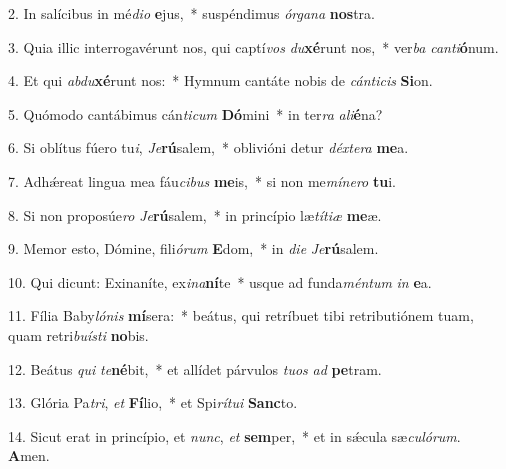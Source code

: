 2. In salícibus in mé\textit{di}\textit{o} \textbf{e}jus,~*  suspéndimus \textit{ór}\textit{ga}\textit{na} \textbf{nos}tra.\

3. Quia illic interrogavérunt nos, qui captí\textit{vos} \textit{du}\textbf{xé}runt nos,~*  ver\textit{ba} \textit{can}\textit{ti}\textbf{ó}num.\

4. Et qui \textit{ab}\textit{du}\textbf{xé}runt nos:~*  Hymnum cantáte nobis de \textit{cán}\textit{ti}\textit{cis} \textbf{Si}on.\

5. Quómodo cantábimus cán\textit{ti}\textit{cum} \textbf{Dó}mini~*  in ter\textit{ra} \textit{a}\textit{li}\textbf{é}na?\

6. Si oblítus fúero tu\textit{i}, \textit{Je}\textbf{rú}salem,~*  oblivióni detur \textit{déx}\textit{te}\textit{ra} \textbf{me}a.\

7. Adhǽreat lingua mea fáu\textit{ci}\textit{bus} \textbf{me}is,~*  si non me\textit{mí}\textit{ne}\textit{ro} \textbf{tu}i.\

8. Si non proposúe\textit{ro} \textit{Je}\textbf{rú}salem,~*  in princípio læ\textit{tí}\textit{ti}\textit{æ} \textbf{me}æ.\

9. Memor esto, Dómine, fili\textit{ó}\textit{rum} \textbf{E}dom,~*  in \textit{di}\textit{e} \textit{Je}\textbf{rú}salem.\

10. Qui dicunt: Exinaníte, ex\textit{i}\textit{na}\textbf{ní}te~*  usque ad funda\textit{mén}\textit{tum} \textit{in} \textbf{e}a.\

11. Fília Baby\textit{ló}\textit{nis} \textbf{mí}sera:~*  beátus, qui retríbuet tibi retributiónem tuam, quam retri\textit{bu}\textit{ís}\textit{ti} \textbf{no}bis.\

12. Beátus \textit{qui} \textit{te}\textbf{né}bit,~*  et allídet párvulos \textit{tu}\textit{os} \textit{ad} \textbf{pe}tram.\

13. Glória Pa\textit{tri}, \textit{et} \textbf{Fí}lio,~*  et Spi\textit{rí}\textit{tu}\textit{i} \textbf{Sanc}to.\

14. Sicut erat in princípio, et \textit{nunc}, \textit{et} \textbf{sem}per,~*  et in sǽcula sæ\textit{cu}\textit{ló}\textit{rum}. \textbf{A}men.\

